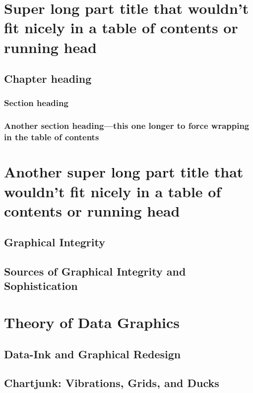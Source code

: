 \documentclass{bayeshyp}
\begin{document}
\part[image={example-image-b},image-options={width=0.25\textwidth},toc={Shorter part title}]{Super long part title that wouldn't fit nicely in a table of contents or running head}
\chapter{Chapter heading}
\section{Section heading}
\section{Another section heading---this one longer to force wrapping in the table of contents}
\lipsum

\part[toc={Old-style, short title=this}]{Another super long part title that wouldn't fit nicely in a table of contents or running head}

\chapter{Graphical Integrity}
\setcounter{page}{53}

\chapter{Sources of Graphical Integrity and Sophistication}
\setcounter{page}{79}

\part{Theory of Data Graphics}

\chapter{Data-Ink and Graphical Redesign}
\setcounter{page}{91}

\chapter{Chartjunk: Vibrations, Grids, and Ducks}
\setcounter{page}{107}
\end{document}
